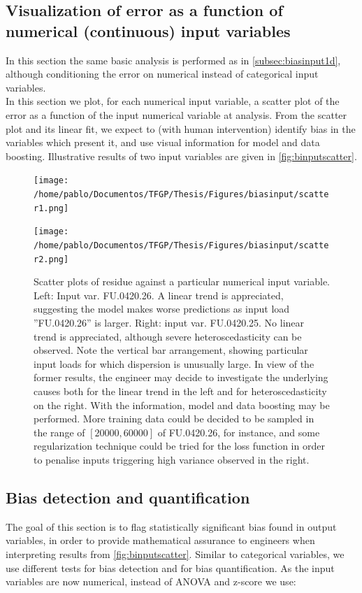 \subsection{Visualization of error as a function of numerical (continuous) input variables}
In this section the same basic analysis is performed as in \autoref{subsec:biasinput1d}, although conditioning the error on numerical instead of categorical input variables.\\
%
\indent In this section we plot, for each numerical input variable, a scatter plot of the error as a function of the input numerical variable at analysis. From the scatter plot and its linear fit, we expect to (with human intervention) identify bias in the variables which present it, and use visual information for model and data boosting. Illustrative results of two input variables are given in \autoref{fig:binputscatter}.\\
\begin{figure}[!htb]
	\centering
	\begin{minipage}[b]{0.508\textwidth}
		\centering
		\texttt{[image: /home/pablo/Documentos/TFGP/Thesis/Figures/biasinput/scatter1.png]}
		\label{fig:imagen1}
	\end{minipage}
	\hfill
	\begin{minipage}[b]{0.48\textwidth}
		\centering
		\texttt{[image: /home/pablo/Documentos/TFGP/Thesis/Figures/biasinput/scatter2.png]}
		\label{fig:imagen2}
	\end{minipage}
	\caption{Scatter plots of residue against a particular numerical input variable.  Left: Input var. FU.0420.26. A linear trend is appreciated, suggesting the model makes worse predictions as input load ''FU.0420.26'' is larger. Right: input var. FU.0420.25. No linear trend is appreciated, although severe heteroscedasticity can be observed. Note the vertical bar arrangement, showing particular input loads for which dispersion is unusually large. In view of the former results, the engineer may decide to investigate the underlying causes both for the linear trend in the left and for heteroscedasticity on the right. With the information, model and data boosting may be performed. More training data could be decided to be sampled in the range of $[20000,60000]$ of FU.0420.26, for instance, and some regularization technique could be tried for the loss function in order to penalise inputs triggering high variance observed in the right.}
	\label{fig:binputscatter}
\end{figure}
%
\subsection{Bias detection and quantification}
The goal of this section is to flag statistically significant bias found in output variables, in order to provide mathematical assurance to engineers when interpreting results from \autoref{fig:binputscatter}. Similar to categorical variables, we use different tests for bias detection and for bias quantification. As the input variables are now numerical, instead of ANOVA and z-score we use:
